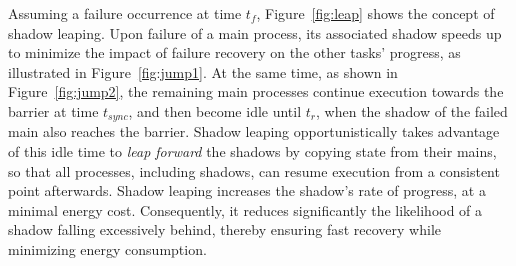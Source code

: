 Assuming a failure occurrence at time $t_f$, Figure~\ref{fig:leap} shows the concept of shadow leaping. 
Upon failure of a main process, its associated shadow speeds up to minimize the impact of failure recovery on the other tasks' progress, as illustrated in Figure~\ref{fig:jump1}. 
At the same time, as shown in Figure~\ref{fig:jump2}, the remaining main processes continue execution towards the barrier at time $t_{sync}$, and then become idle until $t_r$, when the shadow of the failed main also reaches the barrier. %
Shadow leaping opportunistically takes advantage of this idle time to {\it leap forward} the shadows by copying state from their mains, so that  
all processes, including shadows, can resume execution from a consistent point afterwards. %
Shadow leaping increases the shadow's rate of progress, at a minimal energy cost. Consequently, it reduces significantly the likelihood of a shadow falling excessively behind, thereby ensuring fast recovery while minimizing energy consumption.



